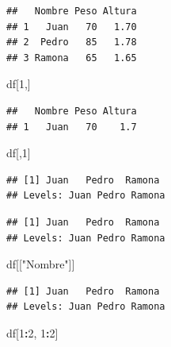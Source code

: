 \documentclass[spanish,]{book}
\newenvironment{Shaded}{\begin{snugshade}}{\end{snugshade}}
\newcommand{\DecValTok}[1]{\textcolor[rgb]{0.00,0.00,0.81}{#1}}
\newcommand{\StringTok}[1]{\textcolor[rgb]{0.31,0.60,0.02}{#1}}
\newcommand{\OperatorTok}[1]{\textcolor[rgb]{0.81,0.36,0.00}{\textbf{#1}}}
\newcommand{\NormalTok}[1]{#1}
\begin{document}
\begin{verbatim}
##   Nombre Peso Altura
## 1   Juan   70   1.70
## 2  Pedro   85   1.78
## 3 Ramona   65   1.65
\end{verbatim}

\begin{Shaded}
\begin{Highlighting}[]
\NormalTok{df[}\DecValTok{1}\NormalTok{,]}
\end{Highlighting}
\end{Shaded}

\begin{verbatim}
##   Nombre Peso Altura
## 1   Juan   70    1.7
\end{verbatim}

\begin{Shaded}
\begin{Highlighting}[]
\NormalTok{df[,}\DecValTok{1}\NormalTok{]}
\end{Highlighting}
\end{Shaded}

\begin{verbatim}
## [1] Juan   Pedro  Ramona
## Levels: Juan Pedro Ramona
\end{verbatim}

\begin{Shaded}
\end{Shaded}

\begin{verbatim}
## [1] Juan   Pedro  Ramona
## Levels: Juan Pedro Ramona
\end{verbatim}

\begin{Shaded}
\begin{Highlighting}[]
\NormalTok{df[[}\StringTok{"Nombre"}\NormalTok{]]}
\end{Highlighting}
\end{Shaded}

\begin{verbatim}
## [1] Juan   Pedro  Ramona
## Levels: Juan Pedro Ramona
\end{verbatim}

\begin{Shaded}
\begin{Highlighting}[]
\NormalTok{df[}\DecValTok{1}\OperatorTok{:}\DecValTok{2}\NormalTok{, }\DecValTok{1}\OperatorTok{:}\DecValTok{2}\NormalTok{]}
\end{Highlighting}
\end{Shaded}
\end{document}
